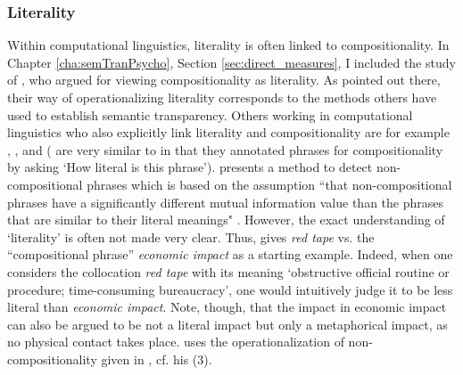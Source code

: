 

\subsubsection{Literality}
\label{sec:literality}
Within computational linguistics, literality is often linked to compositionality.
In Chapter \ref{cha:semTranPsycho}, Section \ref{sec:direct_measures}, I included the study of
\citet{Reddyetal:2011}, who argued for viewing compositionality as
literality. 
As pointed out there, their way of operationalizing
literality corresponds to the methods others have used to establish
semantic transparency. Others working in computational linguistics who also explicitly link literality and compositionality are for example
\citet{Lin:1999}, \citet{KatzandGiesbrecht:2006}, and
\citet{BiemannandGiesbrecht:2011}
(\citealt{BiemannandGiesbrecht:2011} are very similar to 
\citealt{Reddyetal:2011} in that they annotated phrases for compositionality by asking `How literal is this phrase'). \citet{Lin:1999} presents a method to detect
non-compositional phrases which is based on the assumption ``that
non-compositional phrases have a significantly different mutual information
value than the phrases that are similar to their literal
meanings" \citep[321]{Lin:1999}. However, the exact understanding of
`literality' is often not made very clear. Thus, \citet{Lin:1999} gives
\emph{red tape} vs. the ``compositional phrase'' \emph{economic impact} as a
starting example. Indeed, when one considers the collocation \emph{red
  tape} with its meaning `obstructive official routine or procedure;
time-consuming bureaucracy', one would intuitively judge it to be
less literal than \emph{economic impact}. Note, though, that the
impact in
economic impact can also be argued to be not a literal impact but only
a metaphorical impact, as no physical contact takes place. \citet{Lin:1999} uses the operationalization of
 non-compositionality given in \Next, cf. his (3).

